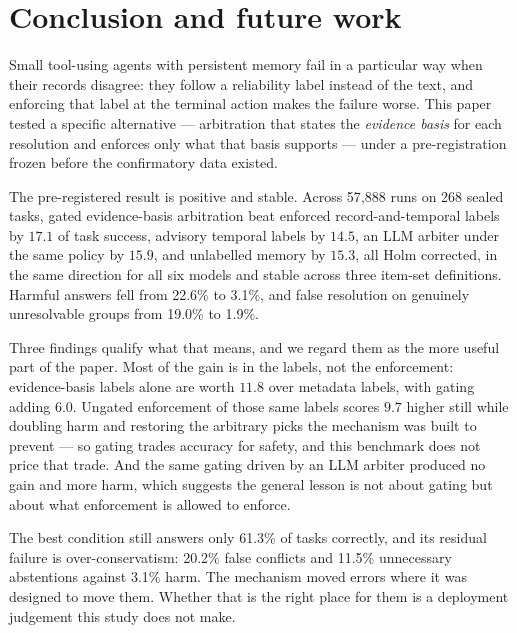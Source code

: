 \section{Conclusion and future work}
\label{sec:conclusion}

Small tool-using agents with persistent memory fail in a particular way when their records disagree: they follow a
reliability label instead of the text, and enforcing that label at the terminal action makes the failure worse.
This paper tested a specific alternative --- arbitration that states the \emph{evidence basis} for each resolution
and enforces only what that basis supports --- under a pre-registration frozen before the confirmatory data
existed.

The pre-registered result is positive and stable. Across 57{,}888 runs on 268 sealed tasks, gated evidence-basis
arbitration beat enforced record-and-temporal labels by $17.1$\pp{} of task success, advisory temporal labels by
$14.5$\pp, an LLM arbiter under the same policy by $15.9$\pp, and unlabelled memory by $15.3$\pp, all Holm
corrected, in the same direction for all six models and stable across three item-set definitions. Harmful answers
fell from 22.6\% to 3.1\%, and false resolution on genuinely unresolvable groups from 19.0\% to 1.9\%.

Three findings qualify what that means, and we regard them as the more useful part of the paper. Most of the gain
is in the labels, not the enforcement: evidence-basis labels alone are worth $11.8$\pp{} over metadata labels,
with gating adding $6.0$\pp. Ungated enforcement of those same labels scores $9.7$\pp{} higher still while doubling
harm and restoring the arbitrary picks the mechanism was built to prevent --- so gating trades accuracy for
safety, and this benchmark does not price that trade. And the same gating driven by an LLM arbiter produced no
gain and more harm, which suggests the general lesson is not about gating but about what enforcement is allowed to
enforce.

The best condition still answers only 61.3\% of tasks correctly, and its residual failure is over-conservatism:
20.2\% false conflicts and 11.5\% unnecessary abstentions against 3.1\% harm. The mechanism moved errors where it
was designed to move them. Whether that is the right place for them is a deployment judgement this study does not
make.

